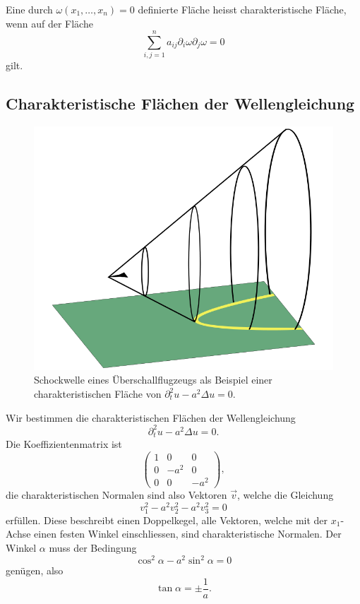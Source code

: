 \begin{definition}
Eine durch $\omega(x_1,\dots,x_n)=0$ definierte Fläche heisst
charakteristische Fläche, wenn auf der Fläche
\[
\sum_{i,j=1}^na_{ij}\partial_i\omega\partial_j\omega=0
\]
gilt.
\end{definition}

\subsection{Charakteristische Flächen der Wellengleichung}
\begin{figure}
\begin{center}
\includegraphics[width=0.8\hsize]{../common/graphics/shock}
\end{center}
\caption{Schockwelle eines Überschallflugzeugs als Beispiel einer
charakteristischen Fläche von $\partial_t^2u-a^2\Delta u=0$.\label{ueberschallkegel}}
\end{figure}
Wir bestimmen die charakteristischen Flächen der
Wellengleichung
\[
\partial_t^2u-a^2\Delta u=0.
\]
Die Koeffizientenmatrix ist
\[
\begin{pmatrix}
1&0&0\\
0&-a^2&0\\
0&0&-a^2
\end{pmatrix},
\]
die charakteristischen Normalen sind also Vektoren $\vec v$, welche die
Gleichung
\[
v_1^2-a^2v_2^2-a^2v_3^2=0
\]
erfüllen. Diese beschreibt einen Doppelkegel, alle Vektoren, welche mit
der $x_1$-Achse einen festen Winkel einschliessen, sind charakteristische
Normalen. Der Winkel $\alpha$ muss der Bedingung
\[
\cos^2\alpha-a^2\sin^2\alpha=0
\]
genügen, also
\[
\tan\alpha=\pm\frac1a.
\]

